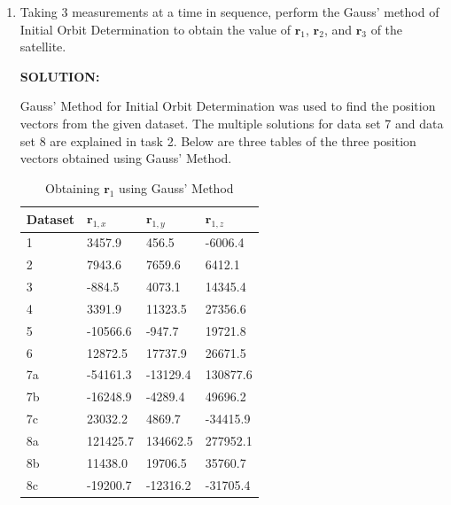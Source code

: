 \documentclass[12pt, letterpaper]{aiaa-tc}
\begin{document}
\begin{enumerate}
    \item Taking 3 measurements at a time in sequence, perform the Gauss' method of Initial Orbit Determination to
    obtain the value of $\bm{r}_1$, $\bm{r}_2$, and $\bm{r}_3$ of the satellite.
    
    \textbf{SOLUTION:}
    
    Gauss' Method for Initial Orbit Determination was used to find the position vectors from the given dataset. 
    The multiple solutions for data set 7 and data set 8 are explained in task 2. Below are three tables of the 
    three position vectors obtained using Gauss' Method.

    \begin{table}[]
        \centering
        \begin{tabular}{|l|lll|}
        \hline
        Dataset & $\bm{r}_{1,x}$                & $\bm{r}_{1,y}$                & $\bm{r}_{1,z}$        \\ \hline
        1       & \multicolumn{1}{l|}{3457.9}   & \multicolumn{1}{l|}{456.5}    & -6006.4  \\ \hline
        2       & \multicolumn{1}{l|}{7943.6}   & \multicolumn{1}{l|}{7659.6}   & 6412.1   \\ \hline
        3       & \multicolumn{1}{l|}{-884.5}   & \multicolumn{1}{l|}{4073.1}   & 14345.4  \\ \hline
        4       & \multicolumn{1}{l|}{3391.9}   & \multicolumn{1}{l|}{11323.5}  & 27356.6  \\ \hline
        5       & \multicolumn{1}{l|}{-10566.6} & \multicolumn{1}{l|}{-947.7}   & 19721.8  \\ \hline
        6       & \multicolumn{1}{l|}{12872.5}  & \multicolumn{1}{l|}{17737.9}  & 26671.5  \\ \hline
        7a      & \multicolumn{1}{l|}{-54161.3} & \multicolumn{1}{l|}{-13129.4} & 130877.6 \\ \hline
        7b      & \multicolumn{1}{l|}{-16248.9} & \multicolumn{1}{l|}{-4289.4}  & 49696.2  \\ \hline
        7c      & \multicolumn{1}{l|}{23032.2}  & \multicolumn{1}{l|}{4869.7}   & -34415.9 \\ \hline
        8a      & \multicolumn{1}{l|}{121425.7} & \multicolumn{1}{l|}{134662.5} & 277952.1 \\ \hline
        8b      & \multicolumn{1}{l|}{11438.0}  & \multicolumn{1}{l|}{19706.5}  & 35760.7  \\ \hline
        8c      & \multicolumn{1}{l|}{-19200.7} & \multicolumn{1}{l|}{-12316.2} & -31705.4 \\ \hline
        \end{tabular}
        \label{g_m_1}
        \caption{Obtaining $\bm{r}_{1}$ using Gauss' Method}
    \end{table}


\end{enumerate}
\end{document}

